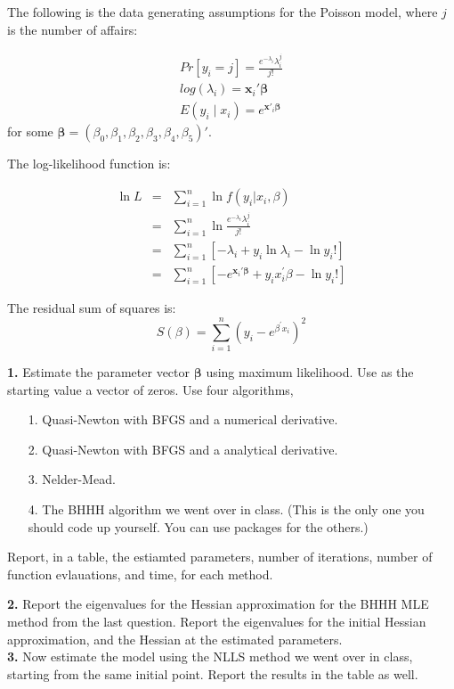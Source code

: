 \documentclass[11pt]{article}
\newcommand{\bs}{\boldsymbol}
\begin{document}
 The following is the data generating assumptions for the Poisson model, where $j$ is the number of affairs:

 \begin{align}
 	Pr[y_i=j] = \frac{e^{-\lambda_i}\lambda_i^j}{j!}\\
 	log(\lambda_i) = \bs{x}_i'\bs{\beta} \\
 	E(y_i\mid x_i) = e^{\bs{x}'_i\bs{\beta}}
 \end{align}
 for some $\bs{\beta} = (\beta_0,\beta_1,\beta_2,\beta_3,\beta_4,\beta_5)'$.

 The log-likelihood function is: 

\begin{eqnarray*}
\ln L &=&\sum\limits_{i=1}^{n}\ln f\left( y_{i}\left\vert x_{i}\right.
,\beta \right) \\
&=&\sum\limits_{i=1}^{n}\ln \frac{e^{-\lambda _{i}}\lambda _{i}^{j}}{j!} \\
&=&\sum\limits_{i=1}^{n}\left[ -\lambda _{i}+y_{i}\ln \lambda _{i}-\ln y_i!%
\right] \\
&=&\sum\limits_{i=1}^{n}\left[ -e^{\mathbf{x}_{i}\prime \mathbf{\beta }%
}+y_{i}x_{i}^{\prime }\beta -\ln y_{i}!\right]
\end{eqnarray*}

The residual sum of squares is:%
\[
S\left( \beta \right) =\sum\limits_{i=1}^{n}\left( y_{i}-e^{\beta ^{\prime
}x_{i}}\right) ^{2} 
\]



\noindent \textbf{1.} Estimate the parameter vector $\bs{\beta}$ using maximum likelihood. Use as the starting value a vector of zeros. Use four algorithms, 

\begin{itemize}
	\item[1.] Quasi-Newton with BFGS and a numerical derivative.
	\item[2.] Quasi-Newton with BFGS and a analytical derivative. 
	\item[3.] Nelder-Mead.
	\item[4.] The BHHH algorithm we went over in class. (This is the only one you should code up yourself. You can use packages for the others.) 
\end{itemize}

Report, in a table, the estiamted parameters, number of iterations, number of function evlauations, and time, for each method.

\noindent \textbf{2.} Report the eigenvalues for the Hessian approximation for the BHHH MLE method from the last question. Report the eigenvalues for the initial Hessian approximation, and the Hessian at the estimated parameters.  \\

\noindent \textbf{3.} Now estimate the model using the NLLS method we went over in class, starting from the same initial point. Report the results in the table as well. \\
\end{document}
